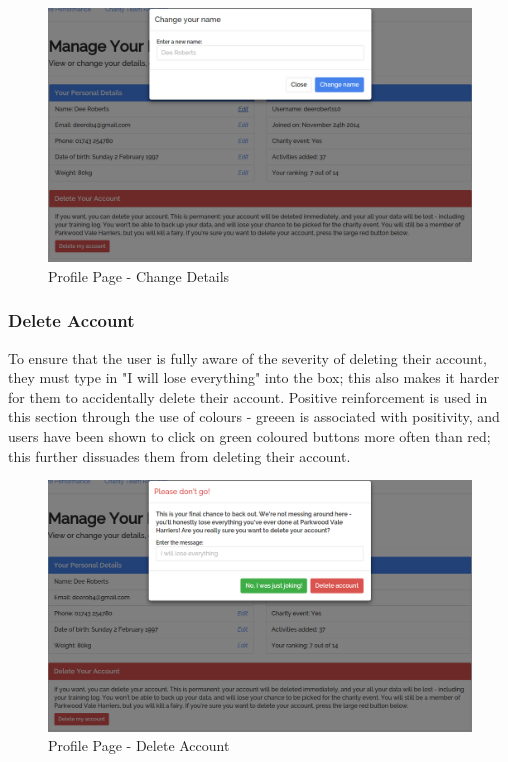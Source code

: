 \documentclass{article}[12pt,a4paper]
\begin{document}
\begin{figure}[h!]
  \includegraphics[scale=0.35]{final_ui/profile_change}
  \caption{Profile Page - Change Details}
\end{figure}
\clearpage

\subsubsection{Delete Account}
To ensure that the user is fully aware of the severity of deleting their account, they must type in "I will lose everything" into the box; this also makes it harder for them to accidentally delete their account. Positive reinforcement is used in this section through the use of colours - greeen is associated with positivity, and users have been shown to click on green coloured buttons more often than red; this further dissuades them from deleting their account.

\begin{figure}[h!]
  \includegraphics[scale=0.35]{final_ui/account_delete}
  \caption{Profile Page - Delete Account}
\end{figure}
\end{document}
